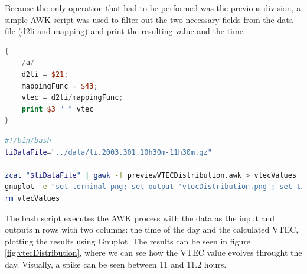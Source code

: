 Because the only operation that had to be performed was the previous division, a simple AWK script was used to filter out the two necessary fields from the data file (d2li and  mapping) and print the resulting value and the time. 

\begin{lstlisting}[language=Awk, caption=process]
{
	/a/
	d2li = $21;
	mappingFunc = $43;
	vtec = d2li/mappingFunc;
	print $3 " " vtec
}
\end{lstlisting}

\begin{lstlisting}[language=Bash, caption=Bash script to execute the procedures]
#!/bin/bash
tiDataFile="../data/ti.2003.301.10h30m-11h30m.gz"

zcat "$tiDataFile" | gawk -f previewVTECDistribution.awk > vtecValues
gnuplot -e "set terminal png; set output 'vtecDistribution.png'; set title 'VTEC Distribution'; set xlabel 'Time of the day (hours)'; set ylabel 'VTEC'; set grid; plot \"vtecValues\" using 1:2 with point"
rm vtecValues
\end{lstlisting}
\clearpage

The bash script executes the AWK process with the data as the input and outputs n rows with two columns: the time of the day and the calculated VTEC, plotting the results using Gnuplot.
The results can be seen in figure \ref{fig:vtecDistribution}, where we can see how the VTEC value evolves throught the day. Visually, a spike can be seen between 11 and 11.2 hours.

